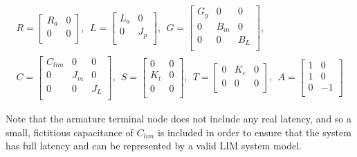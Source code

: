 \begin{multline} \label{eq:lim_sys_3}
R =
\begin{bmatrix}
R_a &  0 \\
0   &  0 \\
\end{bmatrix} ,  \ \ 
L =
\begin{bmatrix}
L_a &  0 \\
0   &  J_p \\
\end{bmatrix} ,  \ \
G =
\begin{bmatrix}
G_g &  0    &  0   \\
0   &  B_m  &  0   \\
0   &  0    &  B_L \\
\end{bmatrix} ,  \ \  \\
C =
\begin{bmatrix}
C_{lim} &  0    &  0   \\
0       &  J_m  &  0   \\
0       &  0    &  J_L \\
\end{bmatrix} ,  \ \
S =
\begin{bmatrix}
0   &  0 \\
K_t &  0 \\
0   &  0 \\
\end{bmatrix} ,  \ \
T =
\begin{bmatrix}
0  &  K_e  &  0  \\
0  &  0    &  0  \\
\end{bmatrix} ,  \ \
A =
\begin{bmatrix}
    1 &  0 \\
    1 &  0 \\
    0 & -1 \\
\end{bmatrix}  
\end{multline}

Note that the armature terminal node does not include any real latency, and so a small, fictitious capacitance of $C_{lim}$ is included in order to ensure that the system has full latency and can be represented by a valid LIM system model. 
